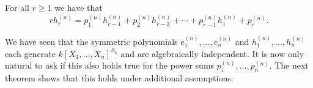 \begin{corollary}
  \label{corollary: relation between h and p}
  For all $r \geq 1$ we have that
  \[
      r h^{(n)}_r
    =   p^{(n)}_1 h^{(n)}_{r-1}
      + p^{(n)}_2 h^{(n)}_{r-2}
      + \dotsb
      + p^{(n)}_{r-1} h^{(n)}_1
      + p^{(n)}_r.
  \]
\end{corollary}


\begin{fluff}
  We have seen that the symmetric polynomials $e^{(n)}_1, \dotsc, e^{(n)}_n$ and $h^{(n)}_1, \dotsc, h^{(n)}_n$ each generate $k[X_1, \dotsc, X_n]^{S_n}$ and are algebraically independent.
  It is now only natural to ask if this also holds true for the power sums $p^{(n)}_1, \dotsc, p^{(n)}_n$.
  The next theorem shows that this holds under additional assumptions.
\end{fluff}


